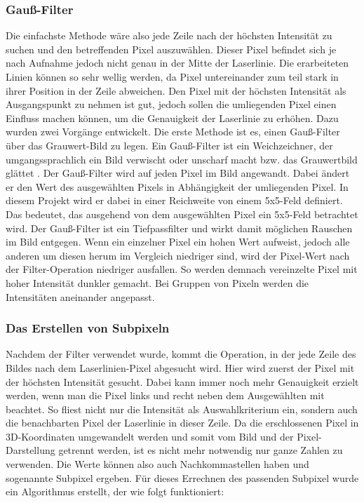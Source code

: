 	\subsubsection{Gauß-Filter}
	Die einfachste Methode wäre also jede Zeile nach der höchsten Intensität zu suchen und den betreffenden Pixel auszuwählen. Dieser Pixel befindet sich je nach Aufnahme jedoch nicht genau in der Mitte der Laserlinie. Die erarbeiteten Linien können so sehr \glqq wellig\grqq{} werden, da Pixel untereinander zum teil stark in ihrer Position in der Zeile abweichen. Den Pixel mit der höchsten Intensität als Ausgangspunkt zu nehmen ist gut, jedoch sollen die umliegenden Pixel einen Einfluss machen können, um die Genauigkeit der Laserlinie zu erhöhen. Dazu wurden zwei Vorgänge entwickelt. \newline
	Die erste Methode ist es, einen Gauß-Filter über das Grauwert-Bild zu legen. Ein Gauß-Filter ist ein Weichzeichner, der umgangssprachlich ein Bild verwischt oder unscharf macht bzw. das Grauwertbild glättet \citep[Vgl.][S. 134ff]{nischwitz_bildverarbeitung_2020}. Der Gauß-Filter wird auf jeden Pixel im Bild angewandt. Dabei ändert er den Wert des ausgewählten Pixels in Abhängigkeit der umliegenden Pixel. In diesem Projekt wird er dabei in einer Reichweite von einem 5x5-Feld definiert. Das bedeutet, das ausgehend von dem ausgewählten Pixel ein 5x5-Feld betrachtet wird. Der Gauß-Filter ist ein Tiefpassfilter und wirkt damit möglichen Rauschen im Bild entgegen. Wenn ein einzelner Pixel ein hohen Wert aufweist, jedoch alle anderen um diesen herum im Vergleich niedriger sind, wird der Pixel-Wert nach der Filter-Operation niedriger ausfallen. So werden demnach vereinzelte Pixel mit hoher Intensität dunkler gemacht. Bei Gruppen von Pixeln werden die Intensitäten aneinander angepasst.
	
	\subsubsection{Das Erstellen von Subpixeln}
	Nachdem der Filter verwendet wurde, kommt die Operation, in der jede Zeile des Bildes nach dem Laserlinien-Pixel abgesucht wird. Hier wird zuerst der Pixel mit der höchsten Intensität gesucht. Dabei kann immer noch mehr  Genauigkeit erzielt werden, wenn man die Pixel links und recht neben dem Ausgewählten mit beachtet. So fliest nicht nur die Intensität als Auswahlkriterium ein, sondern auch die benachbarten Pixel der Laserlinie in dieser Zeile. Da die erschlossenen Pixel in 3D-Koordinaten umgewandelt werden und somit vom Bild und der Pixel-Darstellung getrennt werden, ist es nicht mehr notwendig nur ganze Zahlen zu verwenden. Die Werte können also auch Nachkommastellen haben und sogenannte Subpixel ergeben. Für dieses Errechnen des passenden Subpixel wurde ein Algorithmus erstellt, der wie folgt funktioniert:
	
